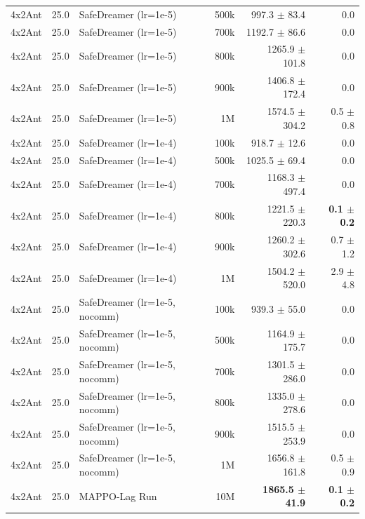 \documentclass{article}
\begin{document}
\begin{longtable}{l r l r r r}
4x2Ant & 25.0 & SafeDreamer (lr=1e-5) & 500k & 997.3 $\pm$ 83.4 & 0.0 \\
4x2Ant & 25.0 & SafeDreamer (lr=1e-5) & 700k & 1192.7 $\pm$ 86.6 & 0.0 \\
4x2Ant & 25.0 & SafeDreamer (lr=1e-5) & 800k & 1265.9 $\pm$ 101.8 & 0.0 \\
4x2Ant & 25.0 & SafeDreamer (lr=1e-5) & 900k & 1406.8 $\pm$ 172.4 & 0.0 \\
4x2Ant & 25.0 & SafeDreamer (lr=1e-5) & 1M & 1574.5 $\pm$ 304.2 & 0.5 $\pm$ 0.8 \\
4x2Ant & 25.0 & SafeDreamer (lr=1e-4) & 100k & 918.7 $\pm$ 12.6 & 0.0 \\
4x2Ant & 25.0 & SafeDreamer (lr=1e-4) & 500k & 1025.5 $\pm$ 69.4 & 0.0 \\
4x2Ant & 25.0 & SafeDreamer (lr=1e-4) & 700k & 1168.3 $\pm$ 497.4 & 0.0 \\
4x2Ant & 25.0 & SafeDreamer (lr=1e-4) & 800k & 1221.5 $\pm$ 220.3 & \textbf{0.1 $\pm$ 0.2} \\
4x2Ant & 25.0 & SafeDreamer (lr=1e-4) & 900k & 1260.2 $\pm$ 302.6 & 0.7 $\pm$ 1.2 \\
4x2Ant & 25.0 & SafeDreamer (lr=1e-4) & 1M & 1504.2 $\pm$ 520.0 & 2.9 $\pm$ 4.8 \\
4x2Ant & 25.0 & SafeDreamer (lr=1e-5, nocomm) & 100k & 939.3 $\pm$ 55.0 & 0.0 \\
4x2Ant & 25.0 & SafeDreamer (lr=1e-5, nocomm) & 500k & 1164.9 $\pm$ 175.7 & 0.0 \\
4x2Ant & 25.0 & SafeDreamer (lr=1e-5, nocomm) & 700k & 1301.5 $\pm$ 286.0 & 0.0 \\
4x2Ant & 25.0 & SafeDreamer (lr=1e-5, nocomm) & 800k & 1335.0 $\pm$ 278.6 & 0.0 \\
4x2Ant & 25.0 & SafeDreamer (lr=1e-5, nocomm) & 900k & 1515.5 $\pm$ 253.9 & 0.0 \\
4x2Ant & 25.0 & SafeDreamer (lr=1e-5, nocomm) & 1M & 1656.8 $\pm$ 161.8 & 0.5 $\pm$ 0.9 \\
4x2Ant & 25.0 & MAPPO-Lag Run & 10M & \textbf{1865.5 $\pm$ 41.9} & \textbf{0.1 $\pm$ 0.2} \\
\end{longtable}
\end{document}
